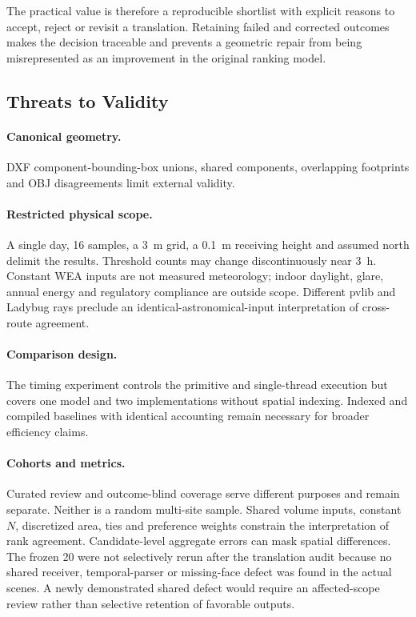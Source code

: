 \documentclass{llncs}
\begin{document}
The practical value is therefore a reproducible shortlist with explicit reasons to accept, reject or revisit a translation. Retaining failed and corrected outcomes makes the decision traceable and prevents a geometric repair from being misrepresented as an improvement in the original ranking model. 

\subsection{Threats to Validity}
\paragraph{Canonical geometry.} DXF component-bounding-box unions, shared components, overlapping footprints and OBJ disagreements limit external validity. 

\paragraph{Restricted physical scope.} A single day, 16 samples, a 3~m grid, a 0.1~m receiving height and assumed north delimit the results. Threshold counts may change discontinuously near 3~h. Constant WEA inputs are not measured meteorology; indoor daylight, glare, annual energy and regulatory compliance are outside scope. Different pvlib and Ladybug rays preclude an identical-astronomical-input interpretation of cross-route agreement.

\paragraph{Comparison design.} The timing experiment controls the primitive and single-thread execution but covers one model and two implementations without spatial indexing.  Indexed and compiled baselines with identical accounting remain necessary for broader efficiency claims.

\paragraph{Cohorts and metrics.} Curated review and outcome-blind coverage serve different purposes and remain separate. Neither is a random multi-site sample. Shared volume inputs, constant $N$, discretized area, ties and preference weights constrain the interpretation of rank agreement. Candidate-level aggregate errors can mask spatial differences. The frozen 20 were not selectively rerun after the translation audit because no shared receiver, temporal-parser or missing-face defect was found in the actual scenes. A newly demonstrated shared defect would require an affected-scope review rather than selective retention of favorable outputs.
\end{document}
